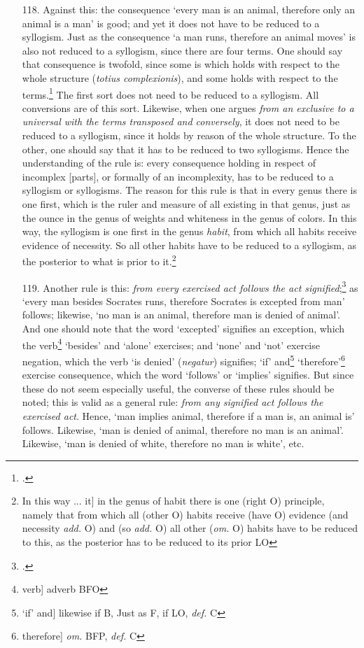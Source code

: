 \begin{itemize}
\item[118.] Against this: the consequence `every man is an animal, therefore only an animal is a man' is good; and yet it does not have to be reduced to a syllogism. Just as the consequence `a man runs, therefore an animal moves' is also not reduced to a syllogism, since there are four terms. One should say that consequence is twofold, since some is which holds with respect to the whole structure (\textit{totius complexionis}), and some holds with respect to the terms.\footnote{\cite[p. 84.20]{BurleyDPAL}.} The first sort does not need to be reduced to a syllogism. All conversions are of this sort. Likewise, when one argues \textit{from an exclusive to a universal with the terms transposed and conversely}, it does not need to be reduced to a syllogism, since it holds by reason of the whole structure. To the other, one should say that it has to be reduced to two syllogisms. Hence the understanding of the rule is: every consequence holding in respect of incomplex [parts], or formally of an incomplexity, has to be reduced to a syllogism or syllogisms. The reason for this rule is that in every genus there is one first, which is the ruler and measure of all existing in that genus, just as the ounce in the genus of weights and whiteness in the genus of colors. In this way, the syllogism is one first in the genus \textit{habit}, from which all habits receive evidence of necessity. So all other habits have to be reduced to a syllogism, as the posterior to what is prior to it.\footnote{In this way ... it] in the genus of habit there is one (right O) principle, namely that from which all (other O) habits receive (have O) evidence (and necessity \textit{add.} O) and (so \textit{add.} O) all other (\textit{om.} O) habits have to be reduced to this, as the posterior has to be reduced to its prior LO}
\item[119.] Another rule is this: \textit{from every exercised act follows the act signified};\footnote{\cite[p. 219.1]{BurleyDPAL}.} as `every man besides Socrates runs, therefore Socrates is excepted from man' follows; likewise, `no man is an animal, therefore man is denied of animal'. And one should note that the word `excepted' signifies an exception, which the verb\footnote{verb] adverb BFO} `besides' and `alone' exercises; and `none' and `not' exercise negation, which the verb `is denied' (\textit{negatur}) signifies; `if' and\footnote{`if' and] likewise if B, Just as F, if LO, \textit{def.} C} `therefore'\footnote{therefore] \textit{om.} BFP, \textit{def.} C} exercise consequence, which the word `follows' or `implies' signifies. But since these do not seem especially useful, the converse of these rules should be noted; this is valid as a general rule: \textit{from any signified act follows the exercised act}. Hence, `man implies animal, therefore if a man is, an animal is' follows. Likewise, `man is denied of animal, therefore no man is an animal'. Likewise, `man is denied of white, therefore no man is white', etc.

\end{itemize}

